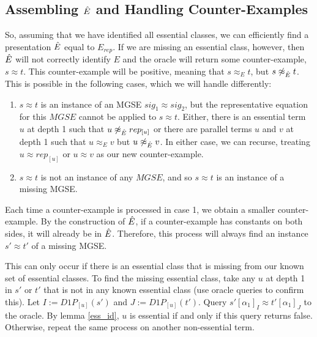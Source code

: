 \subsection{Assembling $\ahat{E}$ and Handling Counter-Examples}
 So, assuming that we have identified all essential classes, we can efficiently find a presentation $\ahat{E}$ equal to $E_{rep}$. 
 If we are missing an essential class, however, then $\ahat{E}$ will not correctly identify $E$ and the oracle will return some counter-example, $s\approx t$.
 This counter-example will be positive, meaning that $s \approx_E t$, but $s \not \approx_{\ahat{E}} t$. 
 This is possible in the following cases, which we will handle differently:
 \begin{enumerate}
 \item $s\approx t$ is an instance of an MGSE $sig_1 \approx sig_2$, but the representative equation for this $MGSE$ cannot be applied to $s\approx t$. Either, there is an essential term $u$ at depth 1 such that $u \not \approx_{\ahat{E}} rep_{[u]}$ or there are parallel terms $u$ and $v$ at depth 1 such that $u\approx_E v$ but $u \not \approx_{\ahat{E}} v$. In either case, we can recurse, treating $u\approx rep_{[u]}$ or $u\approx v$ as our new counter-example. %
 \item $s\approx t$ is not an instance of any $MGSE$, and so $s\approx t$ is an instance of a missing MGSE.
 \end{enumerate}

Each time a counter-example is processed in case 1, we obtain a smaller counter-example. 
By the construction of $\ahat{E}$, if a counter-example has constants on both sides, it will already be in $\ahat{E}$. 
Therefore, this process will always find an instance $s'\approx t'$ of a missing MGSE. 

This can only occur if there is an essential class that is missing from our known set of essential classes. 
To find the missing essential class, take any $u$ at depth 1 in $s'$ or $t'$ that is not in any known essential class (use oracle queries to confirm this).
Let $I := D1P_{[u]}(s')$ and $J := D1P_{[u]}(t')$.
Query $s'[\alpha_1]_I \approx t'[\alpha_1]_J$ to the oracle.
By lemma \ref{ess_id}, $u$ is essential if and only if this query returns false.
Otherwise, repeat the same process on another non-essential term. 

